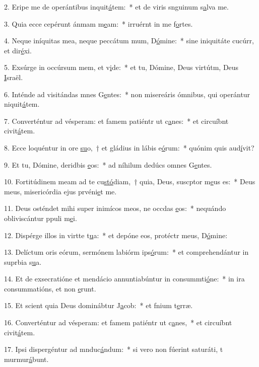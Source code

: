 2. Eripe me de operántibus inquit\uline{á}tem:~* et de viris snguinum s\uline{a}lva me.\par 
3. Quia ecce cepérunt ánmam m\uline{e}am:~* irruérnt in me f\uline{o}rtes.\par 
4. Neque iníquitas mea, neque peccátum mum, D\uline{ó}mine:~* sine iniquitáte cucúrr, et dir\uline{é}xi.\par 
5. Exsúrge in occúrsum mem, et v\uline{i}de:~* et tu, Dómine, Deus virtútm, Deus \uline{I}sraël.\par 
6. Inténde ad visitándas mnes G\uline{e}ntes:~* non misereáris ómnibus, qui operántur niquit\uline{á}tem.\par 
7. Converténtur ad vésperam: et famem patiéntr ut c\uline{a}nes:~* et circuíbnt civit\uline{á}tem.\par 
8. Ecce loquéntur in ore \uline{su}o,~† et gládius in lábis e\uline{ó}rum:~* quónim quis aud\uline{í}vit?\par 
9. Et tu, Dómine, deridbis \uline{e}os:~* ad níhilum dedúcs omnes G\uline{e}ntes.\par 
10. Fortitúdinem meam ad te cu\uline{stó}diam,~† quia, Deus, suscptor m\uline{e}us es:~* Deus meus, misericórdia ejus prvéni\uline{e}t me.\par 
11. Deus osténdet mihi super inimícos meos, ne occdas \uline{e}os:~* nequándo obliviscántur ppuli m\uline{e}i.\par 
12. Dispérge illos in virtte t\uline{u}a:~* et depóne eos, protéctr meus, D\uline{ó}mine:\par 
13. Delíctum oris eórum, sermónem labiórm ips\uline{ó}rum:~* et comprehendántur in suprbia s\uline{u}a.\par 
14. Et de exsecratióne et mendácio annuntiabúntur in consummti\uline{ó}ne:~* in ira consummatións, et non \uline{e}runt.\par 
15. Et scient quia Deus dominábtur J\uline{a}cob:~* et fnium t\uline{e}rræ.\par 
16. Converténtur ad vésperam: et famem patiéntr ut c\uline{a}nes,~* et circuíbnt civit\uline{á}tem.\par 
17. Ipsi dispergéntur ad mnduc\uline{á}ndum:~* si vero non fúerint saturáti, t murmur\uline{á}bunt.\par 
